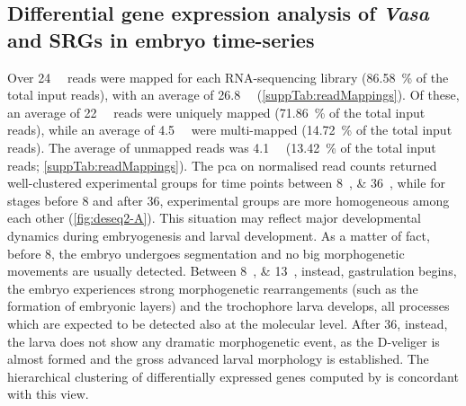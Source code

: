 \subsection{Differential gene expression analysis of \textit{Vasa} and SRGs in embryo time-series} \label{chapter:insitu-DGE}
Over \qty{24}{\mega\nothing} reads were mapped for each RNA-sequencing library (\qty{86.58}{\percent} of the total input reads), with an average of \qty{26.8}{\mega\nothing} (\cref{suppTab:readMappings}). Of these, an average of \qty{22}{\mega\nothing} reads were uniquely mapped (\qty{71.86}{\percent} of the total input reads), while an average of \qty{4.5}{\mega\nothing} were multi-mapped (\qty{14.72}{\percent} of the total input reads). The average of unmapped reads was \qty{4.1}{\mega\nothing} (\qty{13.42}{\percent} of the total input reads; \cref{suppTab:readMappings}). The \gls{pca} on normalised read counts returned well-clustered experimental groups for time points between \qtylist{8;36}{\hpf}, while for stages before \qty{8}{\hpf} and after \qty{36}{\hpf}, experimental groups are more homogeneous among each other (\cref{fig:deseq2-A}). This situation may reflect major developmental dynamics during embryogenesis and larval development. As a matter of fact, before \qty{8}{\hpf}, the embryo undergoes segmentation and no big morphogenetic movements are usually detected. Between \qtylist{8;13}{\hpf}, instead, gastrulation begins, the embryo experiences strong morphogenetic rearrangements (such as the formation of embryonic layers) and the trochophore larva develops, all processes which are expected to be detected also at the molecular level. After \qty{36}{\hpf}, instead, the larva does not show any dramatic morphogenetic event, as the D-veliger is almost formed and the gross advanced larval morphology is established. The hierarchical clustering of differentially expressed genes computed by  is concordant with this view.

